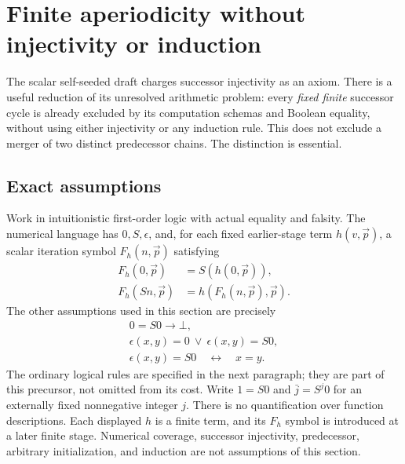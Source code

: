\documentclass[11pt,letterpaper]{article}
\theoremstyle{definition}\newtheorem{definition}[theorem]{Definition}
\theoremstyle{remark}\newtheorem{remark}[theorem]{Remark}
\begin{document}
\section{Finite aperiodicity without injectivity or induction}
\label{sec:finite-aperiodicity}

The scalar self-seeded draft charges successor injectivity as an
axiom.\cite{selfseed}
There is a useful reduction of its unresolved arithmetic problem: every
\emph{fixed finite} successor cycle is already excluded by its computation
schemas and Boolean equality, without using either injectivity or any
induction rule. This does not exclude a merger of two distinct predecessor
chains. The distinction is essential.

\subsection{Exact assumptions}

Work in intuitionistic first-order logic with actual equality and falsity.
The numerical language has $0,S,\epsilon$, and, for each fixed earlier-stage
term $h(v,\vec p)$, a scalar iteration symbol $F_h(n,\vec p)$ satisfying
\begin{align}
 F_h(0,\vec p)&=S(h(0,\vec p)),\label{eq:ac-F0}\\
 F_h(Sn,\vec p)&=h(F_h(n,\vec p),\vec p).
 \label{eq:ac-FS}
\end{align}
The other assumptions used in this section are precisely
\begin{gather}
 0=S0\longrightarrow\bot,\label{eq:ac-sep}\\
 \epsilon(x,y)=0\ \lor\ \epsilon(x,y)=S0,
 \label{eq:ac-range}\\
 \epsilon(x,y)=S0\quad\longleftrightarrow\quad x=y.
 \label{eq:ac-reflection}
\end{gather}
The ordinary logical rules are specified in the next paragraph; they are
part of this precursor, not omitted from its cost. Write $1=S0$ and
$\bar j=S^j0$ for an externally fixed nonnegative integer
$j$. There is no quantification over function descriptions. Each displayed
$h$ is a finite term, and its $F_h$ symbol is introduced at a later finite
stage. Numerical coverage, successor injectivity, predecessor, arbitrary
initialization, and induction are not assumptions of this section.
\end{document}
